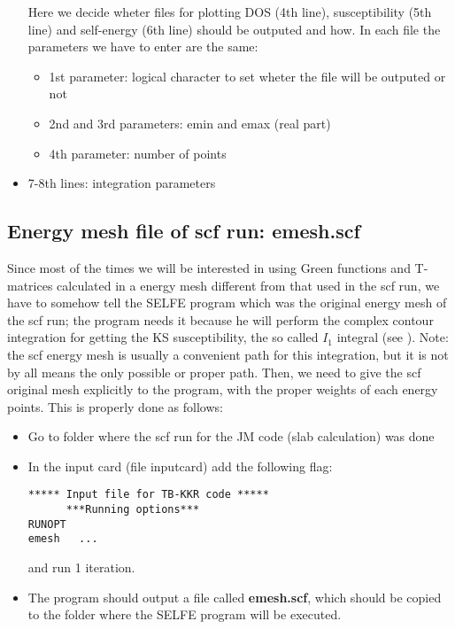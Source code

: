 \documentclass[11pt,fleqn]{book} %
\begin{document}
\begin{itemize}
Here we decide wheter files for plotting DOS (4th line),
susceptibility (5th line) and self-energy (6th line)
should be outputed and how. In each file the parameters we have to enter
are the same:

\begin{itemize}
\item 1st parameter: logical character to set wheter the file will be outputed or not
\item 2nd and 3rd parameters: emin and emax (real part)
\item 4th parameter: number of points
\end{itemize}

\item 7-8th lines: integration parameters

\end{itemize}

\subsection{Energy mesh file of scf run: emesh.scf}

Since most of the times we will be interested in using Green functions and T-matrices
calculated in a energy mesh different from that used in the scf run, we have
to somehow tell the SELFE  program which was the original energy mesh of the
scf run; the program needs it because he will perform the complex contour integration
for getting the KS susceptibility, the so called $I_{1}$ integral (see \cite{samir}).
Note: the scf energy mesh is usually a convenient path for this
integration, but it is not by all means the only possible or proper path.
Then, we need to give the scf original mesh explicitly to the program, with the proper
weights of each energy points. This is properly done as follows:

\begin{itemize}

\item Go to folder where the scf run for the JM code (slab calculation)
was done

\item In the input card (file inputcard) add the following flag:

\begin{VBox}
\begin{verbatim}
***** Input file for TB-KKR code *****
      ***Running options***
RUNOPT
emesh   ...
\end{verbatim}
\end{VBox}
and run 1 iteration.

\item The program should output a file called \textbf{emesh.scf}, which should be
copied to the folder where the SELFE program will be executed.


\end{itemize}
\end{document}
